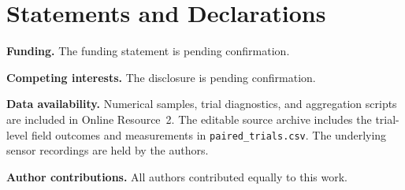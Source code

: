 \documentclass[pdflatex,sn-mathphys-num]{sn-jnl}
\newif\ifdraftreview
\newcommand{\reviewbadge}[1]{%
  \colorbox{reviewfill}{\textcolor{reviewink}{\sffamily\bfseries\strut #1}}}
\newcommand{\pending}[2]{%
  \ifdraftreview
    \hyperlink{author-checklist}{\reviewbadge{#1}}\nobreak\space
    \textcolor{reviewink}{\textbf{[Pending: #2]}}%
  \fi}
\begin{document}


\section*{Statements and Declarations}
\label{sec:declarations}

\textbf{Funding.} The funding statement is pending confirmation. \pending{R5}{Check which awards from the IEEE draft (2026-ANCHOR-15-119, RS-2025-24683458, and 202500590001) supported this work.}

\noindent\textbf{Competing interests.} The disclosure is pending confirmation. \pending{R5}{Confirm the competing interests statement with the coauthors.}

\noindent\textbf{Data availability.} Numerical samples, trial diagnostics, and aggregation scripts are included in Online Resource~2. \ifdefined\JINTPairedPairs The editable source archive includes the trial-level field outcomes and measurements in \texttt{paired\_trials.csv}. \fi The underlying sensor recordings are held by the authors. \pending{R6}{Confirm the archive location and access terms for the underlying recordings before submission.}

\noindent\textbf{Author contributions.} All authors contributed equally to this work.
\end{document}
